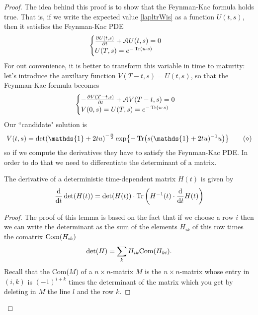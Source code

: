\begin{proof}
    The idea behind this proof is to show that the Feynman-Kac formula holds true. That is, if we write the expected value \eqref{lapltrWis} as a function $U(t,s)$, then it satisfies the Feynman-Kac PDE
    \begin{equation*}
    \begin{cases}
        \pdv{U(t,s)}{t} + \mathcal{A}U(t,s) = 0 \\
        U(T,s) = e^{-\Tr(u\cdot s)}
    \end{cases}
    \end{equation*}
    For out convenience, it is better to transform this variable in time to maturity: let's introduce the auxiliary function $V(T-t,s) = U(t,s)$, so that the Feynman-Kac formula becomes
    \begin{equation*}
    \begin{cases}
        -\pdv{V(T-t,s)}{t} + \mathcal{A}V(T-t,s) = 0 \\
        V(0,s) = U(T,s) = e^{-\Tr(u\cdot s)}
    \end{cases}
    \end{equation*}
    Our ``candidate" solution is
    \begin{equation}\label{vts}
        V(t,s) = \det(\mathds{1}+2tu)^{-\frac{n}{2}}\exp{-\Tr(s(\mathds{1}+2tu)^{-1}u)}\tag{$\diamond$}
    \end{equation}
    so if we compute the derivatives they have to satisfy the Feynman-Kac PDE. In order to do that we need to differentiate the determinant of a matrix.
    \begin{lemma}
        The derivative of a deterministic time-dependent matrix $H(t)$ is given by
        \begin{equation*}
            \dv{}{t}\det(H(t)) = \det(H(t))\cdot\Tr\left(H^{-1}(t)\cdot\dv{}{t}H(t)\right)
        \end{equation*}
    \end{lemma}
    \begin{proof}
        The proof of this lemma is based on the fact that if we choose a row $i$ then we can write the determinant as the sum of the elements $H_{ik}$ of this row times the comatrix $\text{Com}(H_{ik})$
        \begin{equation*}
            \det(H) = \sum_k H_{ik}\text{Com}(H_{ki}).
        \end{equation*}
        Recall that the Com($M$) of a $n\times n$-matrix $M$ is the $n \times n$-matrix whose entry in $(i,k)$ is $(-1)^{i+k}$ times the determinant of the matrix which you get by deleting in $M$ the line $l$ and the row $k$.

\end{proof}
\end{proof}
